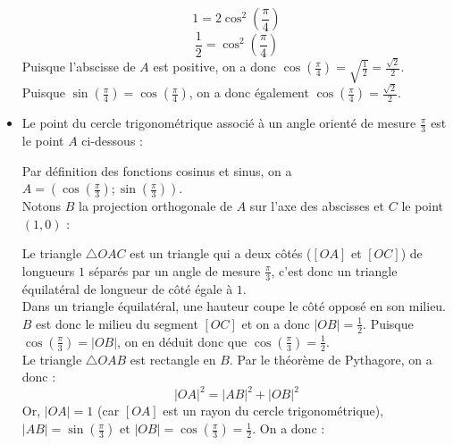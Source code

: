 \documentclass[a4paper,fontsize=13pt]{scrreprt}
\theoremstyle{plain}
\theoremstyle{definition}
\newcommand {\axes} {
	\draw[thick, ->] (\xmin,0) -- (\xmax+1,0);
	\draw[thick, ->] (0,\ymin) -- (0,\ymax+1);
	\draw (0,\ymax+0.5) node [left] {$y$};
	\draw (\xmax+0.5, 0) node [below] {$x$};
	\draw[thick] (-0.15,1)--(0.15,1) (1,-0.15)--(1,0.15);
	\draw (0,1)node[left]{$1$} (1,0)node[below]{$1$};
}
\begin{document}
\begin{itemize}
$$1=2\cos^2(\frac{\pi}{4})$$
$$\frac{1}{2}=\cos^2(\frac{\pi}{4})$$
Puisque l'abscisse de $A$ est positive, on a donc $\cos(\frac{\pi}{4}) = \sqrt{\frac{1}{2}} = \frac{\sqrt{2}}{2}$. Puisque $\sin(\frac{\pi}{4}) = \cos(\frac{\pi}{4})$, on a donc également $\cos(\frac{\pi}{4}) = \frac{\sqrt{2}}{2}$.
\newpage
\item Le point du cercle trigonométrique associé à un angle orienté de mesure $\frac{\pi}{3}$ est le point $A$ ci-dessous :
\begin{center}
\end{center}
Par définition des fonctions cosinus et sinus, on a $A=(\cos(\frac{\pi}{3}) ; \sin(\frac{\pi}{3}))$. \\
Notons $B$ la projection orthogonale de $A$ sur l'axe des abscisses et $C$ le point $(1,0)$ :
\begin{center}
\end{center}
Le triangle $\triangle OAC$ est un triangle qui a deux côtés ($[OA]$ et $[OC]$) de longueurs $1$ séparés par un angle de mesure $\frac{\pi}{3}$, c'est donc un triangle équilatéral de longueur de côté égale à $1$.\\
Dans un triangle équilatéral, une hauteur coupe le côté opposé en son milieu. $B$ est donc le milieu du segment $[OC]$ et on a donc $|OB|=\frac{1}{2}$. Puisque $\cos(\frac{\pi}{3})= |OB|$, on en déduit donc que $\cos(\frac{\pi}{3})=\frac{1}{2}$. \\
Le triangle $\triangle OAB$ est rectangle en $B$. Par le théorème de Pythagore, on a donc :
$${|OA|}^{2}={|AB|}^{2}+{|OB|}^{2}$$
Or, $|OA|=1$ (car $[OA]$ est un rayon du cercle trigonométrique), $|AB|=\sin(\frac{\pi}{3})$ et $|OB|=\cos(\frac{\pi}{3})=\frac{1}{2}$. On a donc :

\end{itemize}
\end{document}
